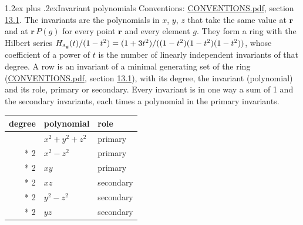\documentclass[10pt,a4paper]{article}
\makeatletter
\renewcommand\section{\@startsection{section}{1}{\z@}{-3ex plus -1ex minus -.2ex}%
  {1.2ex plus .2ex}{\normalfont\large\sffamily\bfseries\color{parttitle}}}
\numberwithin{equation}{section}
\newcommand{\irr}[1]{\text{\normalfont\scshape #1}}
\newcommand{\ptag}[1]{\mathrm{#1}}
\newcommand{\pointr}{\mathbf{r}}
\makeatother
\begin{document}
\section{Invariant polynomials}\label{s:invariant_polynomials}
Conventions: \href{../../CONVENTIONS.pdf}{CONVENTIONS.pdf}, section \href{../../CONVENTIONS.pdf\#conv.13.1}{13.1}.
The invariants are the polynomials in $x$, $y$, $z$ that take the same value at $\pointr$ and at $\pointr\,P(g)$ for every point $\pointr$ and every element $g$. They form a ring with the Hilbert series $H_{\irr{a}_{\ptag{g}}}(t)/(1-t^{2}) = (1 + 3t^{2})/((1-t^{2})(1-t^{2})(1-t^{2}))$, whose coefficient of a power of $t$ is the number of linearly independent invariants of that degree. \label{n:head.degree}\label{n:head.role}A row is an invariant of a minimal generating set of the ring (\href{../../CONVENTIONS.pdf}{CONVENTIONS.pdf}, section \href{../../CONVENTIONS.pdf\#conv.13.1}{13.1}), with its degree, the invariant (polynomial) and its role, primary or secondary. Every invariant is in one way a sum of 1 and the secondary invariants, each times a polynomial in the primary invariants.
{\small\begin{longtable}{@{}rll@{}}\toprule
degree & polynomial & role\\\midrule\endhead
\bottomrule\endfoot\endlastfoot
2 & $x^{2} + y^{2} + z^{2}$ & primary\\*
2 & $x^{2} - z^{2}$ & primary\\*
2 & $xy$ & primary\\*
2 & $xz$ & secondary\\*
2 & $y^{2} - z^{2}$ & secondary\\*
2 & $yz$ & secondary\\
\bottomrule\end{longtable}}
\end{document}
